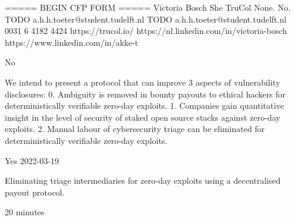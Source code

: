 \documentclass{article}
\begin{document}
===== BEGIN CFP FORM =====
Victoria Bosch
She
TruCol
None.
No.
TODO
a.h.h.toeter@student.tudelft.nl
TODO
a.h.h.toeter@student.tudelft.nl
0031 6 4182 4424
https://trucol.io/
https://nl.linkedin.com/in/victoria-bosch
https://www.linkedin.com/in/akke-t

No

We intend to present a protocol that can improve 3 aspects of vulnerability disclosures:
0. Ambiguity is removed in bounty payouts to ethical hackers for deterministically verifiable zero-day exploits.
1. Companies gain quantitative insight in the level of security of staked open source stacks against zero-day exploits.
2. Manual labour of cybersecurity triage can be eliminated for deterministically verifiable zero-day exploits.

Yes
2022-03-19

Eliminating triage intermediaries for zero-day exploits using a decentralised payout protocol.

20 minutes
\end{document}
